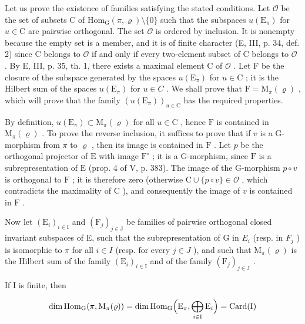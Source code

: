 Let us prove the existence of families satisfying the stated conditions. Let \(\mathcal{O}\) be the set of subsets C of \(\mathrm{Hom}_{\mathrm{G}}(\pi, \varrho)\setminus\{0\}\) such that the subspaces \(u(\mathrm{E}_{\pi})\) for \(u \in \mathrm{C}\) are pairwise orthogonal. The set \(\mathcal{O}\) is ordered by inclusion. It is nonempty because the empty set is a member, and it is of finite character (E, III, p. 34, def. 2) since C belongs to \(\mathcal{O}\) if and only if every two-element subset of C belongs to \(\mathcal{O}\) . By E, III, p. 35, th. 1, there exists a maximal element C of \(\mathcal{O}\) . Let F be the closure of the subspace generated by the spaces \(u(\mathrm{E}_{\pi})\) for \(u \in \mathrm{C}\) ; it is the Hilbert sum of the spaces \(u(\mathrm{E}_{\pi})\) for \(u \in C\) . We shall prove that \(\mathrm{F} = \mathrm{M}_{\pi}(\varrho)\) , which will prove that the family \((u(\mathrm{E}_{\pi}))_{u \in \mathrm{C}}\) has the required properties.

By definition, \(u(\mathrm{E}_{\pi}) \subset \mathrm{M}_{\pi}(\varrho)\) for all \(u \in \mathrm{C}\) , hence \(\mathrm{F}\) is contained in \(\mathrm{M}_{\pi}(\varrho)\) . To prove the reverse inclusion, it suffices to prove that if \(v\) is a G-morphism from \(\pi\) to \(\varrho\) , then its image is contained in \(\mathrm{F}\) . Let \(p\) be the orthogonal projector of \(\mathrm{E}\) with image \(\mathrm{F}^{\circ}\) ; it is a G-morphism, since \(\mathrm{F}\) is a subrepresentation of \(\mathrm{E}\) (prop. 4 of V, p. 383). The image of the G-morphism \(p \circ v\) is orthogonal to \(\mathrm{F}\) ; it is therefore zero (otherwise \(\mathrm{C} \cup \{p \circ v\} \in \mathcal{O}\) , which contradicts the maximality of \(\mathrm{C}\) ), and consequently the image of \(v\) is contained in \(\mathrm{F}\) .

Now let \((\mathrm{E}_{i})_{i\in\mathrm{I}}\) and \((\mathrm{F}_{j})_{j\in\mathrm{J}}\) be families of pairwise orthogonal closed invariant subspaces of E, such that the subrepresentation of G in \(E_{i}\) (resp. in \(F_{j}\) ) is isomorphic to \(\pi\) for all \(i\in I\) (resp. for every \(j\in J\) ), and such that \(\mathrm{M}_{\pi}(\varrho)\) is the Hilbert sum of the family \((\mathrm{E}_{i})_{i\in\mathrm{I}}\) and of the family \((\mathrm{F}_{j})_{j\in\mathrm{J}}\) .

If I is finite, then

\[
\dim \operatorname{Hom} _ {\mathrm{G}} (\pi , \mathrm{M} _ {\pi} (\varrho)) = \dim \operatorname{Hom} _ {\mathrm{G}} \Bigl (\mathrm{E} _ {\pi}, \bigoplus_ {i \in \mathrm{I}} \mathrm{E} _ {i} \Bigr) = \operatorname{Card} (\mathrm{I})
\]


